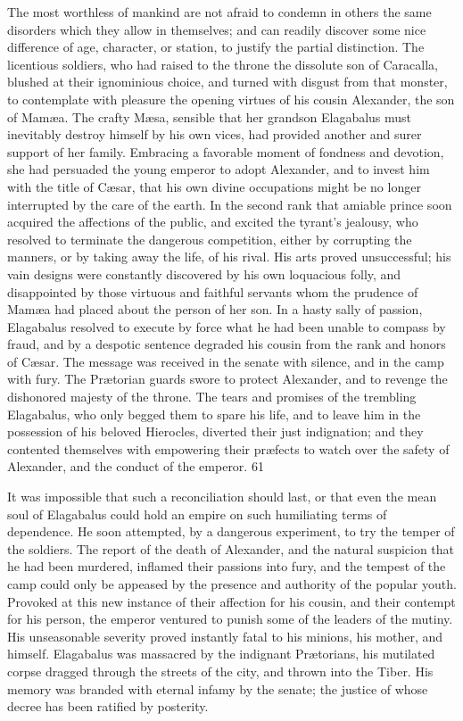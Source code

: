 The most worthless of mankind are not afraid to condemn in others
the same disorders which they allow in themselves; and can
readily discover some nice difference of age, character, or
station, to justify the partial distinction. The licentious
soldiers, who had raised to the throne the dissolute son of
Caracalla, blushed at their ignominious choice, and turned with
disgust from that monster, to contemplate with pleasure the
opening virtues of his cousin Alexander, the son of Mamæa. The
crafty Mæsa, sensible that her grandson Elagabalus must
inevitably destroy himself by his own vices, had provided another
and surer support of her family. Embracing a favorable moment of
fondness and devotion, she had persuaded the young emperor to
adopt Alexander, and to invest him with the title of Cæsar, that
his own divine occupations might be no longer interrupted by the
care of the earth. In the second rank that amiable prince soon
acquired the affections of the public, and excited the tyrant’s
jealousy, who resolved to terminate the dangerous competition,
either by corrupting the manners, or by taking away the life, of
his rival. His arts proved unsuccessful; his vain designs were
constantly discovered by his own loquacious folly, and
disappointed by those virtuous and faithful servants whom the
prudence of Mamæa had placed about the person of her son. In a
hasty sally of passion, Elagabalus resolved to execute by force
what he had been unable to compass by fraud, and by a despotic
sentence degraded his cousin from the rank and honors of Cæsar.
The message was received in the senate with silence, and in the
camp with fury. The Prætorian guards swore to protect Alexander,
and to revenge the dishonored majesty of the throne. The tears
and promises of the trembling Elagabalus, who only begged them to
spare his life, and to leave him in the possession of his beloved
Hierocles, diverted their just indignation; and they contented
themselves with empowering their præfects to watch over the
safety of Alexander, and the conduct of the emperor. 61


It was impossible that such a reconciliation should last, or that
even the mean soul of Elagabalus could hold an empire on such
humiliating terms of dependence. He soon attempted, by a
dangerous experiment, to try the temper of the soldiers. The
report of the death of Alexander, and the natural suspicion that
he had been murdered, inflamed their passions into fury, and the
tempest of the camp could only be appeased by the presence and
authority of the popular youth. Provoked at this new instance of
their affection for his cousin, and their contempt for his
person, the emperor ventured to punish some of the leaders of the
mutiny. His unseasonable severity proved instantly fatal to his
minions, his mother, and himself. Elagabalus was massacred by the
indignant Prætorians, his mutilated corpse dragged through the
streets of the city, and thrown into the Tiber. His memory was
branded with eternal infamy by the senate; the justice of whose
decree has been ratified by posterity.\footnotemark[62]

